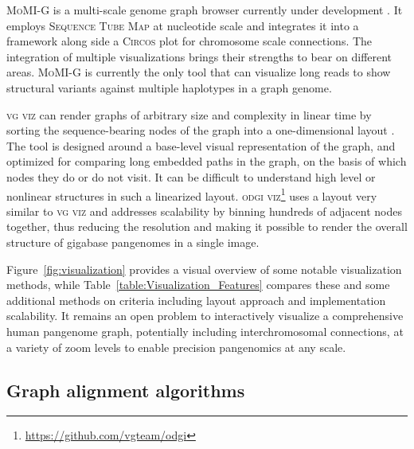 \textsc{MoMI-G} is a multi-scale genome graph browser currently under development \cite{yokoyama_momi-g:_2019}. 
It employs \textsc{Sequence Tube Map} at nucleotide scale and integrates it into a framework along side a \textsc{Circos} \cite{Krzywinski_2009_Circos} plot for chromosome scale connections. 
The integration of multiple visualizations brings their strengths to bear on different areas. 
\textsc{MoMI-G} is currently the only tool that can visualize long reads to show structural variants against multiple haplotypes in a graph genome.

\textsc{vg viz} can render graphs of arbitrary size and complexity in linear time by sorting the sequence-bearing nodes of the graph into a one-dimensional layout \citep{Garrison_2019}. 
The tool is designed around a base-level visual representation of the graph, and optimized for comparing long embedded paths in the graph, on the basis of which nodes they do or do not visit. 
It can be difficult to understand high level or nonlinear structures in such a linearized layout. 
\textsc{odgi viz}\footnote{\url{https://github.com/vgteam/odgi}} uses a layout very similar to \textsc{vg viz} and addresses scalability by binning hundreds of adjacent nodes together, thus reducing the resolution and making it possible to render the overall structure of gigabase pangenomes in a single image.

Figure~\ref{fig:visualization} provides a visual overview of some notable visualization methods, while Table~\ref{table:Visualization_Features} compares these and some additional methods on criteria including layout approach and implementation scalability.
It remains an open problem to interactively visualize a comprehensive human pangenome graph, potentially including interchromosomal connections, at a variety of zoom levels to enable precision pangenomics at any scale.



%

\subsection{Graph alignment algorithms}

